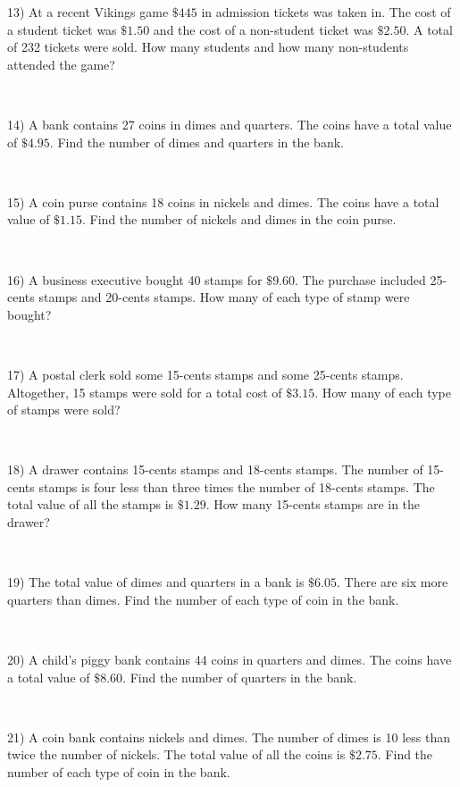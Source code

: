13) At a recent Vikings game $\$445$ in admission tickets was taken
in. The cost of a student ticket was $\$1.50$ and the
cost of a non-student ticket was $\$2.50$. A total of
232 tickets were sold. How many students and how many non-students attended the game?\par
~\par

14) A bank contains 27 coins in dimes and quarters. The coins have a total
value  of $\$4.95$. Find the number of dimes and quarters
in the bank.\par
~\par

15) A coin purse contains 18 coins in nickels and dimes. The coins have a
total value of $\$1.15$. Find the number of nickels
and dimes in the coin purse.\par
~\par

16) A business executive bought 40 stamps for $\$9.60$. The purchase
included 25-cents stamps and 20-cents stamps. How
many of each type of stamp were bought?\par
~\par

17) A postal clerk sold some 15-cents stamps and some 25-cents
stamps. Altogether, 15 stamps were sold for a total cost
of $\$3.15$. How many of each type of stamps were sold?\par
~\par

18) A drawer contains 15-cents stamps and 18-cents stamps. The
number of 15-cents stamps is  four less than three times the
number of 18-cents stamps. The total value of all the
stamps is $\$1.29$. How many 15-cents stamps are in the
drawer?\par
~\par

19) The total value of dimes and quarters in a bank is $\$6.05$.
There are six more quarters than dimes. Find the number of
each type of coin in the bank.\par
~\par

20) A child's piggy bank contains 44 coins in quarters and dimes. The coins
have a total value of $\$8.60$. Find the number of
quarters in the bank.\par
~\par

21) A coin bank contains nickels and dimes. The number of dimes is 10 less
than twice the number of nickels. The total value of all the coins
is $\$2.75$. Find the number of each type of coin in the
bank.\par
~\par

